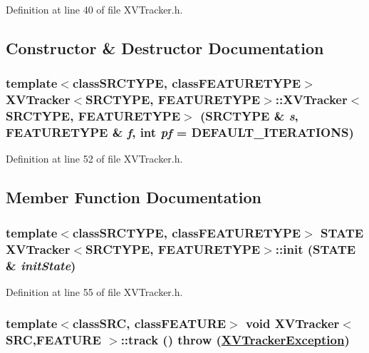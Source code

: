 Definition at line 40 of file XVTracker.h.

\subsection{Constructor \& Destructor Documentation}
\label{XVTracker_a0}
\hypertarget{class_XVTracker_a0}{
\subsubsection[XVTracker]{\setlength{\rightskip}{0pt plus 5cm}template$<$classSRCTYPE, classFEATURETYPE$>$ XVTracker$<$SRCTYPE, FEATURETYPE$>$::XVTracker$<$SRCTYPE, FEATURETYPE$>$ (SRCTYPE \& {\em s}, FEATURETYPE \& {\em f}, int {\em pf} = DEFAULT\_\-ITERATIONS)}}




Definition at line 52 of file XVTracker.h.

\subsection{Member Function Documentation}
\label{XVTracker_a1}
\hypertarget{class_XVTracker_a1}{
\subsubsection[init]{\setlength{\rightskip}{0pt plus 5cm}template$<$classSRCTYPE, classFEATURETYPE$>$ STATE XVTracker$<$SRCTYPE, FEATURETYPE$>$::init (STATE \& {\em init\-State})}}




Definition at line 55 of file XVTracker.h.\label{XVTracker_a2}
\hypertarget{class_XVTracker_a2}{
\subsubsection[track]{\setlength{\rightskip}{0pt plus 5cm}template$<$classSRC, classFEATURE$>$ void XVTracker$<$ SRC,FEATURE $>$::track ()  throw (\hyperlink{class_XVTrackerException}{XVTracker\-Exception})}}




